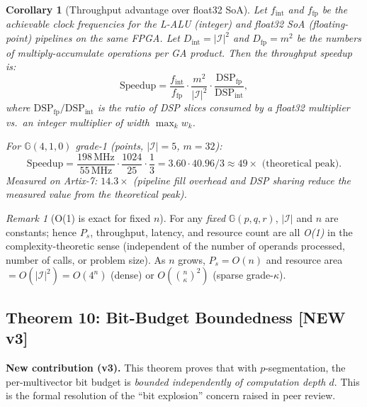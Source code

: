 \documentclass[11pt,a4paper]{article}
\theoremstyle{definition}
\theoremstyle{plain}
\newtheorem{corollary}{Corollary}[section]
\theoremstyle{remark}
\newtheorem{remark}{Remark}[section]
\newcommand{\GA}{\mathbb{G}}
\begin{document}
\begin{corollary}[Throughput advantage over float32 SoA]
\label{cor:speedup}
Let $f_\mathrm{int}$ and $f_\mathrm{fp}$ be the achievable clock
frequencies for the L-ALU (integer) and float32 SoA (floating-point)
pipelines on the same FPGA.
Let $D_\mathrm{int}=|\mathcal{I}|^2$ and $D_\mathrm{fp}=m^2$ be the
numbers of multiply-accumulate operations per GA product.
Then the throughput speedup is:
\begin{equation}\label{eq:speedup}
  \mathrm{Speedup} = \frac{f_\mathrm{int}}{f_\mathrm{fp}}
                     \cdot \frac{m^2}{|\mathcal{I}|^2}
                     \cdot \frac{\mathrm{DSP_{fp}}}{\mathrm{DSP_{int}}},
\end{equation}
where $\mathrm{DSP_{fp}}/\mathrm{DSP_{int}}$ is the ratio of DSP
slices consumed by a float32 multiplier vs.\ an integer multiplier
of width $\max_k w_k$.

For $\GA(4,1,0)$ grade-1 (points, $|\mathcal{I}|=5$, $m=32$):
\[
  \mathrm{Speedup} = \frac{198\,\mathrm{MHz}}{55\,\mathrm{MHz}}
                     \cdot \frac{1024}{25}
                     \cdot \frac{1}{3}
                     = 3.60 \cdot 40.96 / 3
                     \approx 49\times \text{ (theoretical peak)}.
\]
Measured on Artix-7: $14.3\times$ (pipeline fill overhead and DSP sharing
reduce the measured value from the theoretical peak).
\end{corollary}

\begin{remark}[O(1) is exact for fixed $n$]
For any \emph{fixed} $\GA(p,q,r)$, $|\mathcal{I}|$ and $n$ are
constants; hence $P_s$, throughput, latency, and resource count are
all \emph{O(1)} in the complexity-theoretic sense (independent of the
number of operands processed, number of calls, or problem size).
As $n$ grows, $P_s=O(n)$ and resource area $=O(|\mathcal{I}|^2)=O(4^n)$
(dense) or $O(\binom{n}{\kappa}^2)$ (sparse grade-$\kappa$).
\end{remark}

\subsection{Theorem 10: Bit-Budget Boundedness [NEW v3]}
\label{sec:bounded}

\begin{newcontrib}
\textbf{New contribution (v3).}
This theorem proves that with $p$-segmentation, the per-multivector
bit budget is \emph{bounded independently of computation depth $d$}.
This is the formal resolution of the ``bit explosion'' concern
raised in peer review.
\end{newcontrib}
\end{document}
